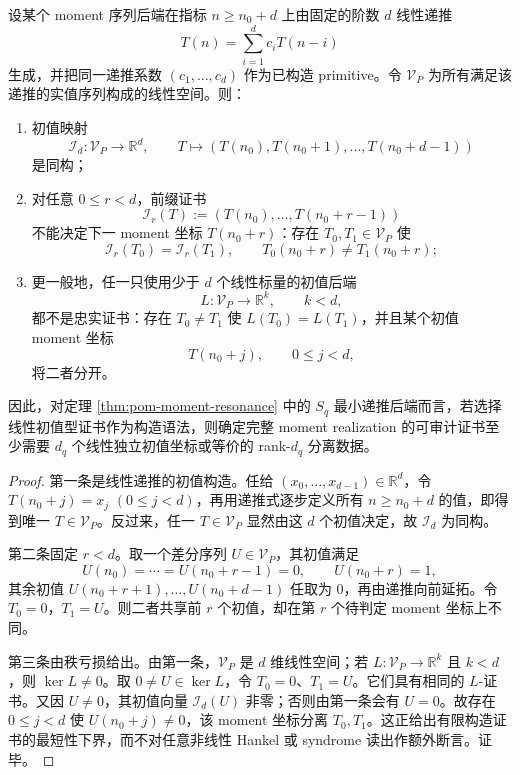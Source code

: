 \begin{proposition}[线性初值后端的最短递推证书下界]\label{distill:euclid_elements-finite_construction_certificate_families-linear-recurrence-initial-certificate-lower-bound}
设某个 moment 序列后端在指标 \(n\ge n_0+d\) 上由固定的阶数 \(d\) 线性递推
\[
T(n)=\sum_{i=1}^{d}c_iT(n-i)
\]
生成，并把同一递推系数 \((c_1,\ldots,c_d)\) 作为已构造 primitive。令 \(\mathcal V_P\) 为所有满足该递推的实值序列构成的线性空间。则：
\begin{enumerate}
  \item 初值映射
  \[
  \mathcal I_d:\mathcal V_P\longrightarrow\mathbb R^d,
  \qquad
  T\longmapsto (T(n_0),T(n_0+1),\ldots,T(n_0+d-1))
  \]
  是同构；
  \item 对任意 \(0\le r<d\)，前缀证书
  \[
  \mathcal I_r(T):=(T(n_0),\ldots,T(n_0+r-1))
  \]
  不能决定下一 moment 坐标 \(T(n_0+r)\)：存在 \(T_0,T_1\in\mathcal V_P\) 使
  \[
  \mathcal I_r(T_0)=\mathcal I_r(T_1),
  \qquad
  T_0(n_0+r)\ne T_1(n_0+r);
  \]
  \item 更一般地，任一只使用少于 \(d\) 个线性标量的初值后端
  \[
  L:\mathcal V_P\to\mathbb R^k,\qquad k<d,
  \]
  都不是忠实证书：存在 \(T_0\ne T_1\) 使 \(L(T_0)=L(T_1)\)，并且某个初值 moment 坐标
  \[
  T(n_0+j),\qquad 0\le j<d,
  \]
  将二者分开。
\end{enumerate}
因此，对定理 \ref{thm:pom-moment-resonance} 中的 \(S_q\) 最小递推后端而言，若选择线性初值型证书作为构造语法，则确定完整 moment realization 的可审计证书至少需要 \(d_q\) 个线性独立初值坐标或等价的 rank-\(d_q\) 分离数据。
\end{proposition}
\begin{proof}
第一条是线性递推的初值构造。任给 \((x_0,\ldots,x_{d-1})\in\mathbb R^d\)，令 \(T(n_0+j)=x_j\) \((0\le j<d)\)，再用递推式逐步定义所有 \(n\ge n_0+d\) 的值，即得到唯一 \(T\in\mathcal V_P\)。反过来，任一 \(T\in\mathcal V_P\) 显然由这 \(d\) 个初值决定，故 \(\mathcal I_d\) 为同构。

第二条固定 \(r<d\)。取一个差分序列 \(U\in\mathcal V_P\)，其初值满足
\[
U(n_0)=\cdots=U(n_0+r-1)=0,
\qquad
U(n_0+r)=1,
\]
其余初值 \(U(n_0+r+1),\ldots,U(n_0+d-1)\) 任取为 \(0\)，再由递推向前延拓。令 \(T_0=0\)，\(T_1=U\)。则二者共享前 \(r\) 个初值，却在第 \(r\) 个待判定 moment 坐标上不同。

第三条由秩亏损给出。由第一条，\(\mathcal V_P\) 是 \(d\) 维线性空间；若 \(L:\mathcal V_P\to\mathbb R^k\) 且 \(k<d\)，则 \(\ker L\ne0\)。取 \(0\ne U\in\ker L\)，令 \(T_0=0\)、\(T_1=U\)。它们具有相同的 \(L\)-证书。又因 \(U\ne0\)，其初值向量 \(\mathcal I_d(U)\) 非零；否则由第一条会有 \(U=0\)。故存在 \(0\le j<d\) 使 \(U(n_0+j)\ne0\)，该 moment 坐标分离 \(T_0,T_1\)。这正给出有限构造证书的最短性下界，而不对任意非线性 Hankel 或 syndrome 读出作额外断言。证毕。
\end{proof}

